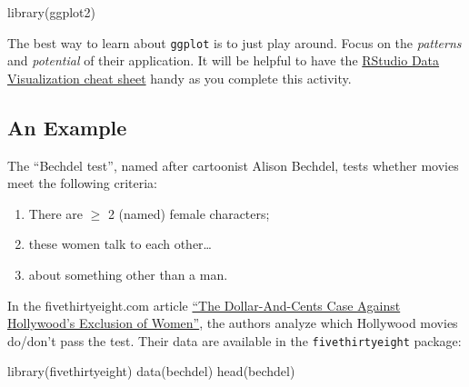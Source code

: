 \documentclass[
  letterpaper,
  DIV=11,
  numbers=noendperiod]{scrreprt}
\newenvironment{Shaded}{\begin{snugshade}}{\end{snugshade}}
\newcommand{\FunctionTok}[1]{\textcolor[rgb]{0.28,0.35,0.67}{#1}}
\newcommand{\NormalTok}[1]{\textcolor[rgb]{0.00,0.23,0.31}{#1}}
\providecommand{\tightlist}{%
  \setlength{\itemsep}{0pt}\setlength{\parskip}{0pt}}\usepackage{longtable,booktabs,array}
\begin{document}
\begin{Shaded}
\begin{Highlighting}[]
\FunctionTok{library}\NormalTok{(ggplot2)}
\end{Highlighting}
\end{Shaded}

The best way to learn about \texttt{ggplot} is to just play around.
Focus on the \emph{patterns} and \emph{potential} of their application.
It will be helpful to have the
\href{https://raw.githubusercontent.com/rstudio/cheatsheets/main/data-visualization.pdf}{RStudio
Data Visualization cheat sheet} handy as you complete this activity.

\subsection*{An Example}\label{an-example}

The ``Bechdel test'', named after cartoonist Alison Bechdel, tests
whether movies meet the following criteria:

\begin{enumerate}
\def\labelenumi{\arabic{enumi}.}
\tightlist
\item
  There are \(\ge\) 2 (named) female characters;\\
\item
  these women talk to each other\ldots{}\\
\item
  about something other than a man.
\end{enumerate}

In the fivethirtyeight.com article
\href{http://fivethirtyeight.com/features/the-dollar-and-cents-case-against-hollywoods-exclusion-of-women/}{``The
Dollar-And-Cents Case Against Hollywood's Exclusion of Women''}, the
authors analyze which Hollywood movies do/don't pass the test. Their
data are available in the \texttt{fivethirtyeight} package:

\begin{Shaded}
\begin{Highlighting}[]
\FunctionTok{library}\NormalTok{(fivethirtyeight)}
\FunctionTok{data}\NormalTok{(bechdel)}
\FunctionTok{head}\NormalTok{(bechdel)}
\end{Highlighting}
\end{Shaded}
\end{document}
